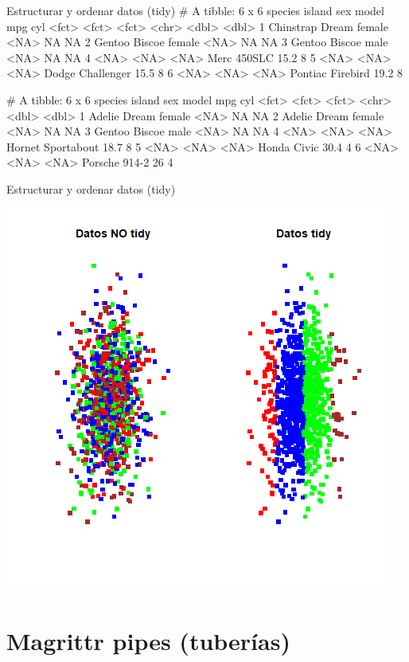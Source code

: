 \documentclass[
  ignorenonframetext,
  aspectratio=169]{beamer}
\let\oldverbatim\verbatim
\let\endoldverbatim\endverbatim
\renewenvironment{verbatim}{\tiny\oldverbatim}{\endoldverbatim}
\begin{document}
\begin{frame}[fragile]{Estructurar y ordenar datos (tidy)}
\protect\hypertarget{estructurar-y-ordenar-datos-tidy-2}{}
\begin{verbatim}
# A tibble: 6 x 6
  species   island sex    model              mpg   cyl
  <fct>     <fct>  <fct>  <chr>            <dbl> <dbl>
1 Chinstrap Dream  female <NA>              NA      NA
2 Gentoo    Biscoe female <NA>              NA      NA
3 Gentoo    Biscoe male   <NA>              NA      NA
4 <NA>      <NA>   <NA>   Merc 450SLC       15.2     8
5 <NA>      <NA>   <NA>   Dodge Challenger  15.5     8
6 <NA>      <NA>   <NA>   Pontiac Firebird  19.2     8
\end{verbatim}

\begin{verbatim}
# A tibble: 6 x 6
  species island sex    model               mpg   cyl
  <fct>   <fct>  <fct>  <chr>             <dbl> <dbl>
1 Adelie  Dream  female <NA>               NA      NA
2 Adelie  Dream  female <NA>               NA      NA
3 Gentoo  Biscoe male   <NA>               NA      NA
4 <NA>    <NA>   <NA>   Hornet Sportabout  18.7     8
5 <NA>    <NA>   <NA>   Honda Civic        30.4     4
6 <NA>    <NA>   <NA>   Porsche 914-2      26       4
\end{verbatim}
\end{frame}

\begin{frame}{Estructurar y ordenar datos (tidy)}
\protect\hypertarget{estructurar-y-ordenar-datos-tidy-3}{}
\begin{center}\includegraphics[width=0.5\linewidth]{Imgs/plot_tidy} \end{center}
\end{frame}

\hypertarget{magrittr-pipes-tuberuxedas}{%
\section{Magrittr pipes (tuberías)}\label{magrittr-pipes-tuberuxedas}}
\end{document}
